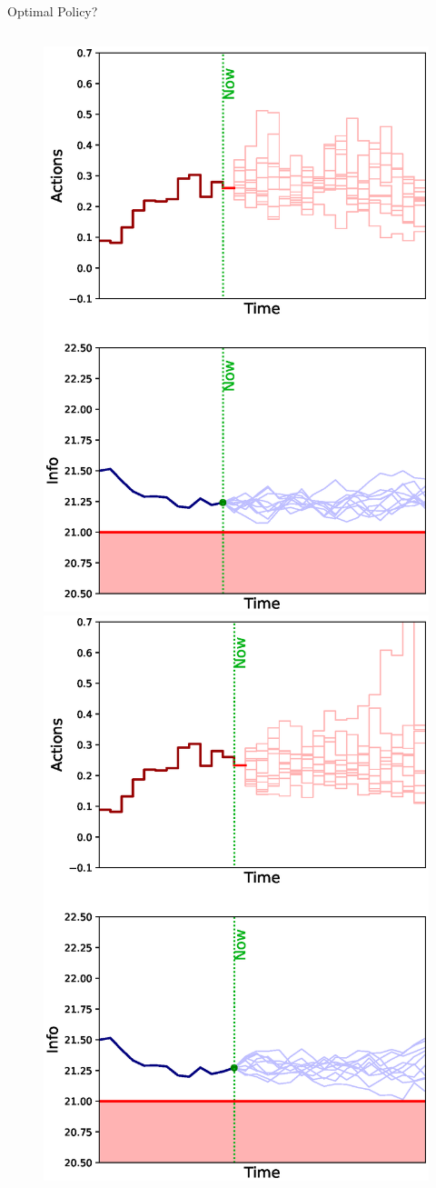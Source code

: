\documentclass[lecture]{beamer}
\begin{document}
\begin{frame}{\normalsize Optimal Policy?}
\begin{columns}[t]
{\begin{overlayarea}{\textwidth}{0.8\textheight}
\begin{figure}
{        }%
        {%
          \includegraphics[width=.8\textwidth]{Codes/Basics/Policy11.eps}%
        }%
        {%
          \includegraphics[width=.8\textwidth]{Codes/Basics/Policy12.eps}%
}
\end{figure}
\end{overlayarea}}
\end{columns}
\end{frame}
\end{document}
